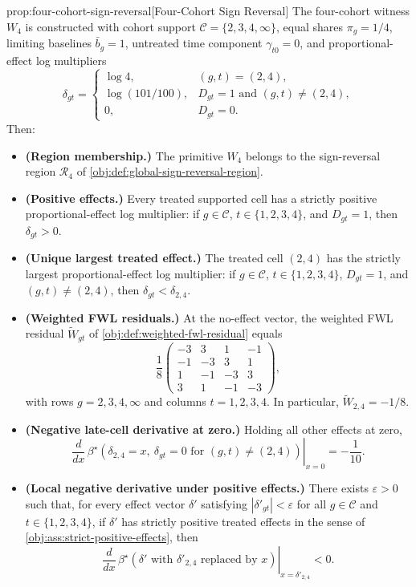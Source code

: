 \begin{theoremv}{prop:four-cohort-sign-reversal}[Four-Cohort Sign Reversal]
The four-cohort witness \(W_4\) is constructed with cohort support
\(\mathcal C=\{2,3,4,\infty\}\), equal shares \(\pi_g=1/4\), limiting baselines
\(\bar b_g=1\), untreated time component \(\gamma_{t0}=0\), and proportional-effect
log multipliers
\[
\delta_{gt}=
\begin{cases}
\log 4, & (g,t)=(2,4),\\
\log(101/100), & D_{gt}=1 \text{ and } (g,t)\neq(2,4),\\
0, & D_{gt}=0 .
\end{cases}
\]
Then:
\begin{itemize}
\item \textbf{(Region membership.)} The primitive \(W_4\) belongs to the sign-reversal region \(\mathcal R_4\) of \cref{obj:def:global-sign-reversal-region}.
\item \textbf{(Positive effects.)} Every treated supported cell has a strictly positive proportional-effect log multiplier: if \(g\in\mathcal C\), \(t\in\{1,2,3,4\}\), and \(D_{gt}=1\), then \(\delta_{gt}>0\).
\item \textbf{(Unique largest treated effect.)} The treated cell \((2,4)\) has the strictly largest proportional-effect log multiplier: if \(g\in\mathcal C\), \(t\in\{1,2,3,4\}\), \(D_{gt}=1\), and \((g,t)\neq(2,4)\), then \(\delta_{gt}<\delta_{2,4}\).
\item \textbf{(Weighted FWL residuals.)} At the no-effect vector, the weighted FWL residual \(\widetilde W_{gt}\) of \cref{obj:def:weighted-fwl-residual} equals
\[
\frac{1}{8}
\begin{pmatrix}
-3 & 3 & 1 & -1\\
-1 & -3 & 3 & 1\\
1 & -1 & -3 & 3\\
3 & 1 & -1 & -3
\end{pmatrix},
\]
with rows \(g=2,3,4,\infty\) and columns \(t=1,2,3,4\). In particular, \(\widetilde W_{2,4}=-1/8\).
\item \textbf{(Negative late-cell derivative at zero.)} Holding all other effects at zero,
\[
\left.\frac{d}{dx}\,
\beta^\star\!\left(\delta_{2,4}=x,\ \delta_{gt}=0\text{ for }(g,t)\neq(2,4)\right)
\right|_{x=0}
=-\frac{1}{10}.
\]
\item \textbf{(Local negative derivative under positive effects.)} There exists \(\varepsilon>0\) such that, for every effect vector \(\delta'\) satisfying \(|\delta'_{gt}|<\varepsilon\) for all \(g\in\mathcal C\) and \(t\in\{1,2,3,4\}\), if \(\delta'\) has strictly positive treated effects in the sense of \cref{obj:ass:strict-positive-effects}, then
\[
\left.
\frac{d}{dx}\,
\beta^\star\!\left(\delta' \text{ with } \delta'_{2,4}\text{ replaced by }x\right)
\right|_{x=\delta'_{2,4}}
<0 .
\]
\end{itemize}
\end{theoremv}

